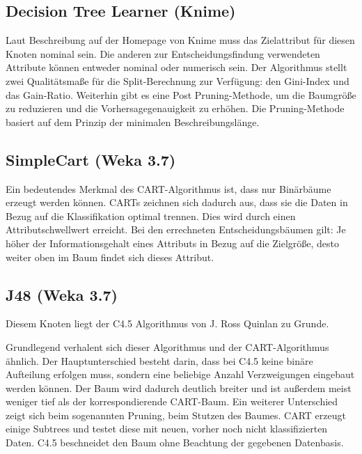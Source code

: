 \documentclass[12pt,					%
							 oneside,			%
							 a4paper,			%
							 halfparskip,		%
							 liststotoc,			%
							 bibtotoc,			%
							 fleqn,				%
							 pointlessnumbers]	%
							 {scrreprt}
\begin{document}
		\subsection{Decision Tree Learner (Knime)}
			Laut Beschreibung auf der Homepage von Knime muss das Zielattribut für diesen Knoten nominal sein. Die anderen zur Entscheidungsfindung verwendeten Attribute können entweder nominal oder numerisch sein. Der Algorithmus stellt zwei Qualitätsmaße für die Split-Berechnung zur Verfügung: den Gini-Index und das Gain-Ratio. Weiterhin gibt es eine Post Pruning-Methode, um die Baumgröße zu reduzieren und die Vorhersagegenauigkeit zu erhöhen. Die Pruning-Methode basiert auf dem Prinzip der minimalen Beschreibungslänge.\cite{DecTreeLearner}
		
		\subsection{SimpleCart (Weka 3.7)}
			Ein bedeutendes Merkmal des CART-Algorithmus ist, dass nur Binärbäume erzeugt werden können. CARTs zeichnen sich dadurch aus, dass sie die Daten in Bezug auf die Klassifikation optimal trennen. Dies wird durch einen Attributschwellwert erreicht. Bei den errechneten Entscheidungsbäumen gilt: Je höher der Informationsgehalt eines Attributs in Bezug auf die Zielgröße, desto weiter oben im Baum findet sich dieses Attribut.\cite{Breiman1983}
			
			
		\subsection{J48 (Weka 3.7)}
			Diesem Knoten liegt der C4.5 Algorithmus von J. Ross Quinlan zu Grunde.
			
			Grundlegend verhalent sich dieser Algorithmus und der CART-Algorithmus ähnlich. Der Hauptunterschied besteht darin, dass bei C4.5 keine binäre Aufteilung erfolgen muss, sondern eine beliebige Anzahl Verzweigungen eingebaut werden können. Der Baum wird dadurch deutlich breiter und ist außerdem meist weniger tief als der korrespondierende CART-Baum. Ein weiterer Unterschied zeigt sich beim sogenannten Pruning, beim Stutzen des Baumes. CART erzeugt einige Subtrees und testet diese mit neuen, vorher noch nicht klassifizierten Daten. C4.5 beschneidet den Baum ohne Beachtung der gegebenen Datenbasis.\cite{Salzberg1994}
			
			
\end{document}

